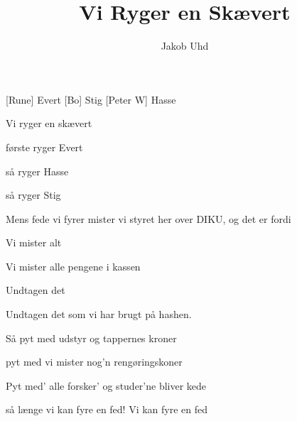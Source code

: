 \documentclass[a4paper]{article}
\title{Vi Ryger en Skævert}
\author{Jakob Uhd}
\begin{document}
\maketitle

\begin{roles}
  [Rune] Evert
  [Bo] Stig
  [Peter W] Hasse
\end{roles}

\begin{song}

 Vi ryger en skævert

 første ryger Evert

 så ryger Hasse

 så ryger Stig

 Mens fede vi fyrer
mister vi styret
her over DIKU, og det er fordi

 Vi mister alt

 Vi mister alle pengene i kassen

 Undtagen det

 Undtagen det som vi har brugt på hashen.

 Så pyt med udstyr og tappernes kroner

 pyt med vi mister nog'n rengøringskoner

 Pyt med' alle forsker' og studer'ne bliver kede

 så længe vi kan fyre en fed!
Vi kan fyre en fed

\end{song}
\end{document}
